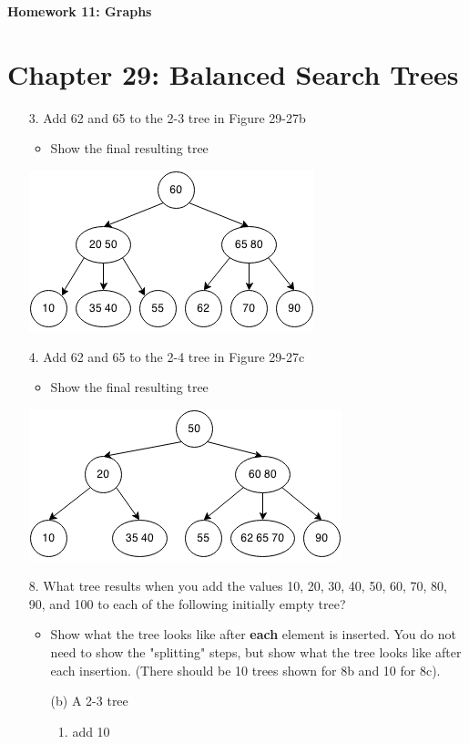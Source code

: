 \documentclass[10pt]{article}
\begin{document}
\begin{center}
	\Large{\textbf{Homework 11: Graphs}}
\end{center}

\section{Chapter 29: Balanced Search Trees}
\begin{enumerate}
	\item[3.] Add 62 and 65 to the 2-3 tree in Figure 29-27b
		\begin{itemize}
			\item Show the final resulting tree
		\end{itemize}
		
		\includegraphics[scale=0.5]{images/29_3.png}
	
	\item[4.] Add 62 and 65 to the 2-4 tree in Figure 29-27c
		\begin{itemize}
			\item Show the final resulting tree
		\end{itemize}
		
		\includegraphics[scale=0.5]{images/29_4.png}
	
	\item[8.] What tree results when you add the values 10, 20, 30, 40, 50, 60, 70, 80, 90, and 100 to each of the following initially empty tree?
		\begin{itemize}
			\item Show what the tree looks like after \textbf{each} element is inserted. You do not need to show the "splitting" steps, but show what the tree looks like after each insertion. (There should be 10 trees shown for 8b and 10 for 8c).
		\end{itemize}
		\begin{enumerate}
			\item[(b)] A 2-3 tree
				\begin{enumerate}
					\item add 10
					

\end{enumerate}
\end{enumerate}
\end{enumerate}
\end{document}
